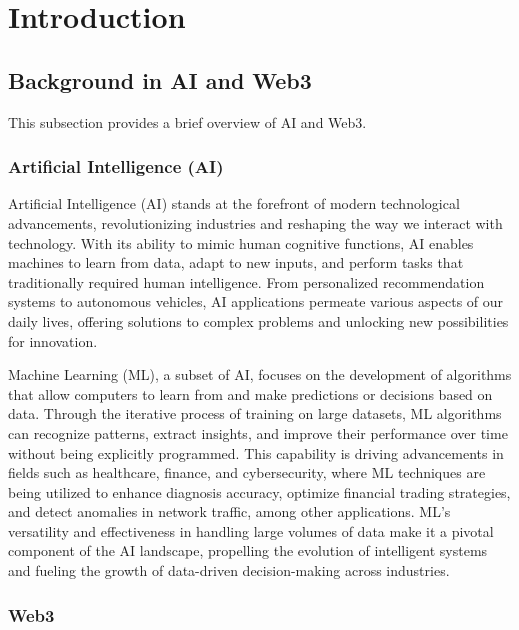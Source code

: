 \documentclass[conference]{IEEEtran}
\begin{document}


\section{Introduction}
\subsection{Background in AI and Web3}

This subsection provides a brief overview of AI and Web3.

\subsubsection{Artificial Intelligence (AI)}


Artificial Intelligence (AI) stands at the forefront of modern technological advancements, revolutionizing industries and reshaping the way we interact with technology. With its ability to mimic human cognitive functions, AI enables machines to learn from data, adapt to new inputs, and perform tasks that traditionally required human intelligence. From personalized recommendation systems to autonomous vehicles, AI applications permeate various aspects of our daily lives, offering solutions to complex problems and unlocking new possibilities for innovation.

Machine Learning (ML), a subset of AI, focuses on the development of algorithms that allow computers to learn from and make predictions or decisions based on data. Through the iterative process of training on large datasets, ML algorithms can recognize patterns, extract insights, and improve their performance over time without being explicitly programmed. This capability is driving advancements in fields such as healthcare, finance, and cybersecurity, where ML techniques are being utilized to enhance diagnosis accuracy, optimize financial trading strategies, and detect anomalies in network traffic, among other applications. ML's versatility and effectiveness in handling large volumes of data make it a pivotal component of the AI landscape, propelling the evolution of intelligent systems and fueling the growth of data-driven decision-making across industries.

\subsubsection{Web3}
\end{document}
